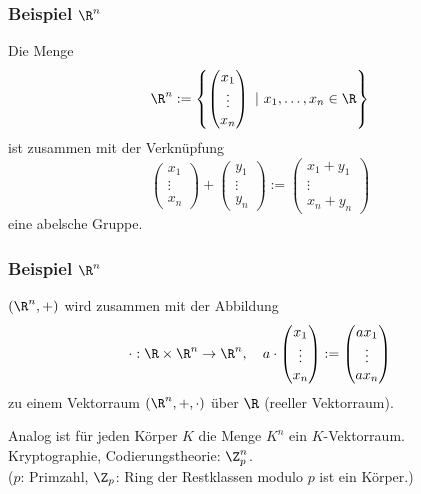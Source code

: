 %
%
\begin{frame}\frametitle{Beispiel $\R^n$}
	
	Die Menge
	$$
		\R^n :=
		\left\{
			\begin{pmatrix}
				x_1\\ 
				\vdots\\
				x_n
			\end{pmatrix}
			~| ~
			x_1,\ldots, x_n \in \R
		\right\}
	$$ 
	ist zusammen mit der Verknüpfung
	$$
		\begin{pmatrix}
			x_1\\ 
			\vdots\\
			x_n
		\end{pmatrix}	
		+
		\begin{pmatrix}
			y_1\\ 
			\vdots\\
			y_n
		\end{pmatrix}
		:=
		\begin{pmatrix}
			x_1 + y_1\\ 
			\vdots\\
			x_n + y_n
		\end{pmatrix}							
	$$
	eine abelsche Gruppe.

\end{frame}
%
%
\begin{frame}\frametitle{Beispiel $\R^n$}
	
	$(\R^n,+)$ wird zusammen mit der Abbildung
	$$
		\cdot: \R\times\R^n \to \R^n,\quad
			a
			\cdot
			\begin{pmatrix}
				x_1\\ 
				\vdots\\
				x_n
			\end{pmatrix}
			:=
			\begin{pmatrix}
				ax_1\\ 
				\vdots\\
				ax_n
			\end{pmatrix}			
	$$ 
	zu einem Vektorraum $(\R^n,+,\cdot)$ über $\R$ (reeller Vektorraum).
	
	\pause
	\vspace{10mm}
	Analog ist für jeden Körper $K$ die Menge $K^n$ ein $K$-Vektorraum.\\[2mm]
	\pause
	Kryptographie, Codierungstheorie: $\Z_p^n$.\\ 
	($p$: Primzahl, $\Z_p$: Ring der Restklassen modulo $p$ ist ein Körper.)
	
\end{frame}
%
%
